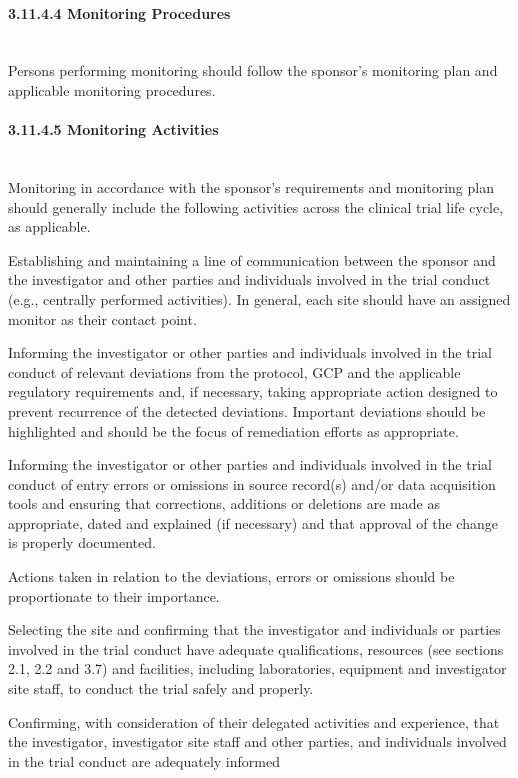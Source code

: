 \documentclass[11pt]{article}
\begin{document}
\paragraph{3.11.4.4 Monitoring Procedures}\mbox{}\\

Persons performing monitoring should follow the sponsor's monitoring plan and applicable monitoring procedures.


\paragraph{3.11.4.5 Monitoring Activities}\mbox{}\\

Monitoring in accordance with the sponsor's requirements and monitoring plan should generally include the following activities across the clinical trial life cycle, as applicable.


\begin{description}[leftmargin=2.5cm,style=sameline]

\item[(a)] Establishing and maintaining a line of communication between the sponsor and the investigator and other parties and individuals involved in the trial conduct (e.g., centrally performed activities). In general, each site should have an assigned monitor as their contact point.

\item[(b)] Informing the investigator or other parties and individuals involved in the trial conduct of relevant deviations from the protocol, GCP and the applicable regulatory requirements and, if necessary, taking appropriate action designed to prevent recurrence of the detected deviations. Important deviations should be highlighted and should be the focus of remediation efforts as appropriate.

\item[(c)] Informing the investigator or other parties and individuals involved in the trial conduct of entry errors or omissions in source record(s) and/or data acquisition tools and ensuring that corrections, additions or deletions are made as appropriate, dated and explained (if necessary) and that approval of the change is properly documented.

\item[(d)] Actions taken in relation to the deviations, errors or omissions should be proportionate to their importance.

\item[(a)] Selecting the site and confirming that the investigator and individuals or parties involved in the trial conduct have adequate qualifications, resources (see sections 2.1, 2.2 and 3.7) and facilities, including laboratories, equipment and investigator site staff, to conduct the trial safely and properly.

\item[(b)] Confirming, with consideration of their delegated activities and experience, that the investigator, investigator site staff and other parties, and individuals involved in the trial conduct are adequately informed

\end{description}
\end{document}
